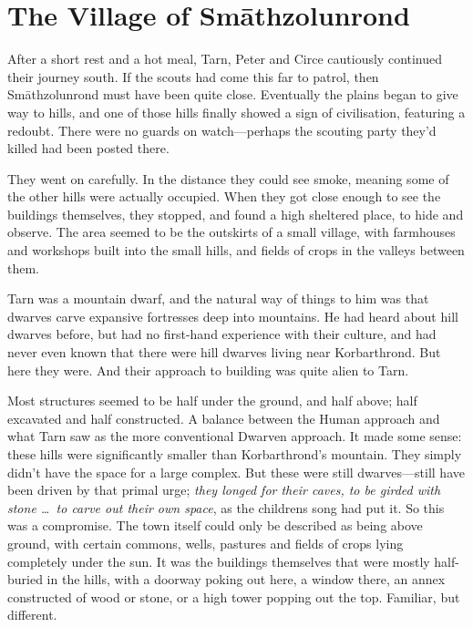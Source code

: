 \chapter{The Village of Sm\=athzolunrond}

After a short rest and a hot meal, Tarn, Peter and Circe cautiously continued their journey south.  If the scouts had come this far to patrol, then Sm\=athzolunrond must have been quite close.  Eventually the plains began to give way to hills, and one of those hills finally showed a sign of civilisation, featuring a redoubt.  There were no guards on watch---perhaps the scouting party they'd killed had been posted there.

They went on carefully.  In the distance they could see smoke, meaning some of the other hills were actually occupied.  When they got close enough to see the buildings themselves, they stopped, and found a high sheltered place, to hide and observe.  The area seemed to be the outskirts of a small village, with farmhouses and workshops built into the small hills, and fields of crops in the valleys between them.

Tarn was a mountain dwarf, and the natural way of things to him was that dwarves carve expansive fortresses deep into mountains.  He had heard about hill dwarves before, but had no first-hand experience with their culture, and had never even known that there were hill dwarves living near Korbarthrond.  But here they were.  And their approach to building was quite alien to Tarn.

Most structures seemed to be half under the ground, and half above; half excavated and half constructed.  A balance between the Human approach and what Tarn saw as the more conventional Dwarven approach.  It made some sense: these hills were significantly smaller than Korbarthrond's mountain.  They simply didn't have the space for a large complex.  But these were still dwarves---still have been driven by that primal urge; \emph{they longed for their caves, to be girded with stone \ldots\ to carve out their own space}, as the childrens song had put it.  So this was a compromise.  The town itself could only be described as being above ground, with certain commons, wells, pastures and fields of crops lying completely under the sun.  It was the buildings themselves that were mostly half-buried in the hills, with a doorway poking out here, a window there, an annex constructed of wood or stone, or a high tower popping out the top.  Familiar, but different.


